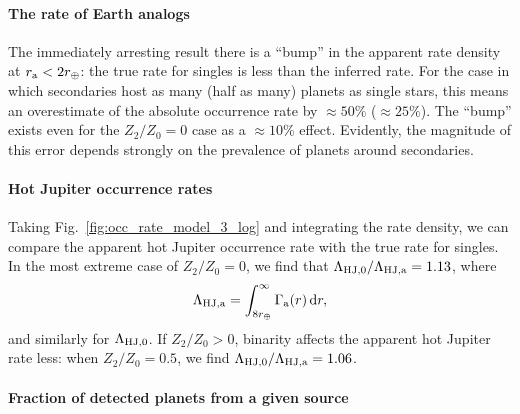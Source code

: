 \documentclass[12pt,modern]{aastex61}
\renewcommand{\a}{_{\rm a}}
\begin{document}
\paragraph{The rate of Earth analogs}
The immediately arresting result there is a ``bump'' in the apparent rate 
density at $r\a < 2r_\oplus$: the true rate for singles is less than the 
inferred rate.
For the case in which secondaries host as many (half as many) planets as 
single stars, this means an overestimate of the absolute occurrence rate by 
$\approx 50\%$ ($\approx 25\%$).
The ``bump'' exists even for the $Z_2/Z_0=0$ case as a $\approx 10\%$ effect.
Evidently, the magnitude of this error depends strongly on the prevalence of 
planets around secondaries.

\paragraph{Hot Jupiter occurrence rates}
Taking Fig.~\ref{fig:occ_rate_model_3_log} and integrating the rate density, 
we can compare the apparent hot Jupiter 
occurrence rate with the true rate for singles.
In the most extreme case of $Z_2/Z_0=0$, we find that $\Lambda_{{\rm 
HJ},0}/\Lambda_{\rm HJ,a} = 1.13$, where
\begin{equation}
\Lambda_{\rm HJ,a} = \int_{8r_\oplus}^{\infty} \Gamma\a(r)\,{\rm d}r,
\end{equation}
and similarly for $\Lambda_{\rm HJ,0}$.
If $Z_2/Z_0>0$, binarity affects the apparent hot Jupiter rate less: when 
$Z_2/Z_0=0.5$, we find $\Lambda_{{\rm HJ},0}/\Lambda_{\rm HJ,a} = 1.06$.

\paragraph{Fraction of detected planets from a given source}
\end{document}
